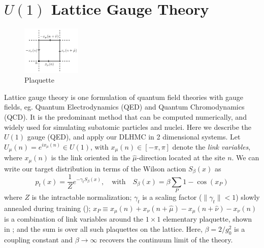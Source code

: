 \documentclass{article} %
\begin{document}
\section{\label{sec:latticegaugetheory}\(U(1)\) Lattice Gauge Theory}
%
\begin{figure}
      \centering
      \includegraphics[width=0.25\textwidth]{figures/plaq_tikz.pdf}
      \caption{\label{fig:plaquette}Plaquette}%
\end{figure}
Lattice gauge theory is one formulation of quantum field theories with gauge fields, eg. Quantum Electrodynamics (QED)
and Quantum Chromodynamics (QCD).
%
It is the predominant method that can be computed numerically, and widely used for simulating subatomic particles and
nuclei.
%
Here we describe the \(U(1)\) gauge (QED), and apply our DLHMC in 2 dimensional systems.
%
Let \(U_{\mu}(n) = e^{i x_{\mu}(n)} \in U(1)\), with \(x_{\mu}(n) \in [-\pi,\pi]\) denote the \emph{link variables},
where \(x_{\mu}(n)\) is the link oriented in the \(\hat{\mu}\)-direction located at the site \(n\).
%
We can write our target distribution in terms of the Wilson action \(S_{\beta}(x)\) as
%
\begin{equation}
   p_{t}(x) = \frac{1}{Z}e^{-\gamma_{t} S_{\beta}(x)},\quad\text{with}\quad S_{\beta}(x) = \beta \sum_{P}1 - \cos(x_{P})
   \label{eq:wilsonaction}
\end{equation}
%
where $Z$ is the intractable normalization;
\(\gamma_{t}\) is a scaling factor (\(\|\gamma_{t}\|<1\)) slowly annealed during training ();
\(x_{P} \equiv x_{\mu}(n) + x_{\nu}(n+\hat{\mu}) - x_{\mu}(n+\hat{\nu}) -x_{\nu}(n)\) is a combination of link
variables around the \(1\times1\) elementary plaquette, shown in ; and the sum is over all
such plaquettes on the lattice.
%
Here, \(\beta = 2 / g_{0}^{2}\) is a coupling constant and \(\beta\rightarrow\infty\) recovers the continuum limit of
the theory. 
%
\end{document}
